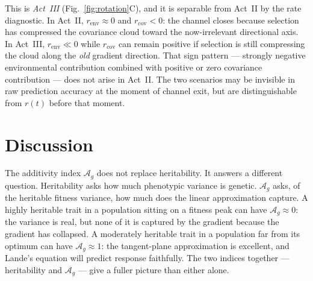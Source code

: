 \documentclass[9pt,twocolumn,twoside]{pnas-new}
\newcommand{\Ag}{\mathcal{A}_{g}}
\begin{document}
This is \textit{Act~III} (Fig.~\ref{fig:rotation}C), and it is
separable from Act~II by the rate diagnostic.
In Act~II, $r_{\mathrm{env}} \approx 0$ and $r_{\mathrm{cov}} < 0$:
the channel closes because selection has compressed the covariance
cloud toward the now-irrelevant directional axis.
In Act~III, $r_{\mathrm{env}} \ll 0$ while $r_{\mathrm{cov}}$ can
remain positive if selection is still compressing the cloud along
the \emph{old} gradient direction.
That sign pattern --- strongly negative environmental contribution
combined with positive or zero covariance contribution --- does not
arise in Act~II.
The two scenarios may be invisible in raw prediction accuracy at the
moment of channel exit, but are distinguishable from $r(t)$ before
that moment.

\section*{Discussion}

The additivity index $\Ag$ does not replace heritability.
It answers a different question.
Heritability asks how much phenotypic variance is genetic.
$\Ag$ asks, of the heritable fitness variance, how much does the
linear approximation capture.
A highly heritable trait in a population sitting on a fitness peak
can have $\Ag \approx 0$: the variance is real, but none of it is
captured by the gradient because the gradient has collapsed.
A moderately heritable trait in a population far from its optimum
can have $\Ag \approx 1$: the tangent-plane approximation is
excellent, and Lande's equation will predict response faithfully.
The two indices together --- heritability and $\Ag$ --- give a
fuller picture than either alone.
\end{document}
